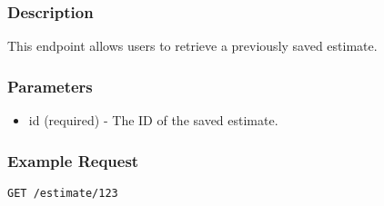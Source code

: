 \documentclass{article}
\begin{document}
\subsubsection{Description}

This endpoint allows users to retrieve a previously saved estimate.

\subsubsection{Parameters}

\begin{itemize}
  \item id (required) - The ID of the saved estimate.
\end{itemize}

\subsubsection{Example Request}

\begin{verbatim}
GET /estimate/123
\end{verbatim}
\end{document}
